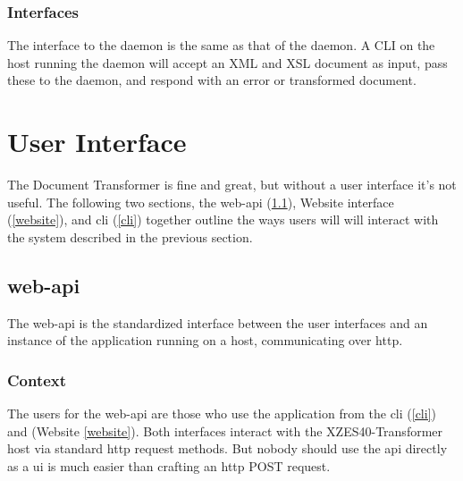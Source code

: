 \begin{enmerate}
\begin{itemzie}
\subsubsection{Interfaces}

The interface to the daemon is the same as that of the daemon.
A CLI on the host running the daemon will accept an XML and XSL document as input, pass these to the daemon, and respond with an error or transformed document.

\section{User Interface}
\label{user-interface}

The Document Transformer is fine and great, but without a user interface it's not useful.
The following two sections, the \gls{web-api} (\ref{web-api}), Website interface (\ref{website}), and \gls{cli} (\ref{cli}) together outline the ways users will will interact with the system described in the previous section.

\subsection{\gls{web-api}}
\label{web-api}

The \gls{web-api} is the standardized interface between the user interfaces and an instance of the application running on a host, communicating over \gls{http}.

\subsubsection{Context}

The users for the \gls{web-api} are those who use the application from the \gls{cli} (\ref{cli}) and (Website \ref{website}).
Both interfaces interact with the XZES40-Transformer host via standard \gls{http} request methods.
But nobody should use the \gls{api} directly as a \gls{ui} is much easier than crafting an \gls{http} POST request.


\end{itemzie}
\end{enmerate}
